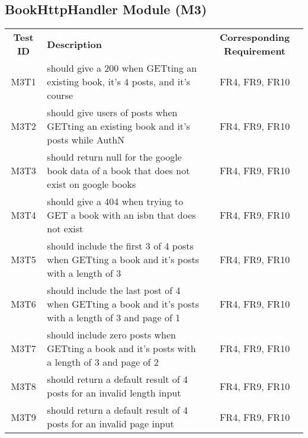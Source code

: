 \documentclass[fullpage]{article}
\begin{document}
\begin{table}[H]
\begin{tabular}{|c|p{8.5cm}|p{5cm}|}
\end{tabular}
\end{table}

\subsection{BookHttpHandler Module (M3)}
\begin{table}[H]
\flushleft
\begin{tabular}{|c|p{8.5cm}|c|}
\hline
 \rowcolor{lightgray} 
\textbf{Test ID} &\textbf{Description} &\textbf{Corresponding Requirement}\\
M3T1 & should give a 200 when GETting an existing book, it's 4 posts, and it's course & FR4, FR9, FR10 \\
\hline
M3T2 & should give users of posts when GETting an existing book and it's posts while AuthN & FR4, FR9, FR10 \\
\hline
M3T3 & should return null for the google book data of a book that does not exist on google books & FR4, FR9, FR10 \\
\hline
M3T4 & should give a 404 when trying to GET a book with an isbn that does not exist & FR4, FR9, FR10 \\
\hline
M3T5 & should include the first 3 of 4 posts when GETting a book and it's posts with a length of 3 & FR4, FR9, FR10 \\
\hline
M3T6 & should include the last post of 4 when GETting a book and it's posts with a length of 3 and page of 1 & FR4, FR9, FR10 \\
\hline
M3T7 & should include zero posts when GETting a book and it's posts with a length of 3 and page of 2 & FR4, FR9, FR10 \\
\hline
M3T8 & should return a default result of 4 posts for an invalid length input & FR4, FR9, FR10 \\
\hline
M3T9 & should return a default result of 4 posts for an invalid page input & FR4, FR9, FR10 \\


\hline
\end{tabular}
\end{table}
\end{document}

